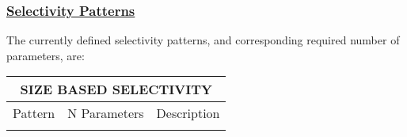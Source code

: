 \hypertarget{SelexPattern}{}
\subsubsection[Selectivity Patterns]{\protect\hyperlink{SelexPattern}{Selectivity Patterns}}
The currently defined selectivity patterns, and corresponding required number of parameters, are:


\begin{longtable}{p{2cm} p{3cm} p{10cm}}
	\multicolumn{3}{c}{SIZE BASED SELECTIVITY} \Bstrut\\	
	\endfirsthead

	\hline
	Pattern & N Parameters & Description \Tstrut\Bstrut\\
	\hline
	\endhead

	\hline
	\endfoot
	\endlastfoot

	\hline
		

\end{longtable}
